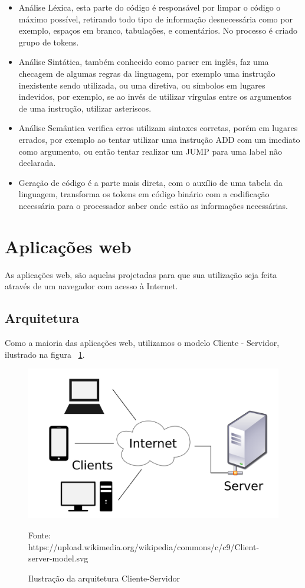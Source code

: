 		\begin{itemize}
			\item Análise Léxica, esta parte do código é responsável por limpar o código o máximo possível, retirando todo tipo de informação desnecessária como por exemplo, espaços em branco, tabulações, e comentários. No processo é criado grupo de tokens.
			\item Análise Sintática, também conhecido como parser em inglês, faz uma checagem de algumas regras da linguagem, por exemplo uma instrução inexistente sendo utilizada, ou uma diretiva, ou símbolos em lugares indevidos, por exemplo, se ao invés de utilizar vírgulas entre os argumentos de uma instrução, utilizar asteriscos.
			\item Análise Semântica verifica erros utilizam sintaxes corretas, porém em lugares errados, por exemplo ao tentar utilizar uma instrução ADD com um imediato como argumento, ou então tentar realizar um JUMP para uma label não declarada. 
			\item Geração de código é a parte mais direta, com o auxílio de uma tabela da linguagem, transforma os tokens em código binário com a codificação necessária para o processador saber onde estão as informações necessárias.
		\end{itemize} 


\section{Aplicações web}

	As aplicações web, são aquelas projetadas para que sua utilização seja feita através de um navegador com acesso à Internet.

	\subsection{Arquitetura}
		
		Como a maioria das aplicações web, utilizamos o modelo Cliente - Servidor, ilustrado na figura ~\ref{fig:client-server-model}.

		\begin{figure}
		  \includegraphics[width=\linewidth]{img/client-server-model.png}
		  \caption{Ilustração da arquitetura Cliente-Servidor}
		  Fonte: https://upload.wikimedia.org/wikipedia/commons/c/c9/Client-server-model.svg
		  \label{fig:client-server-model}
		\end{figure}

